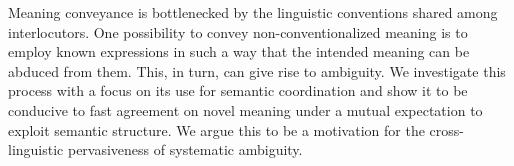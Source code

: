 Meaning conveyance is bottlenecked by the linguistic conventions shared among interlocutors. One possibility to convey non-conventionalized meaning is to employ known expressions in such a way that the intended meaning can be abduced from them. This, in turn, can give rise to ambiguity. We investigate this process with a focus on its use for semantic coordination and show it to be conducive to fast agreement on novel meaning under a mutual expectation to exploit semantic structure. We argue this to be a motivation for the cross-linguistic pervasiveness of systematic ambiguity.
